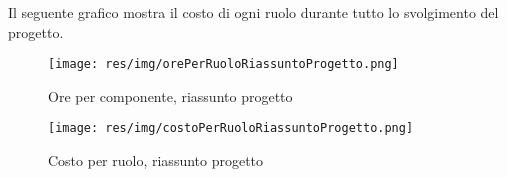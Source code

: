 Il seguente grafico mostra il costo di ogni ruolo durante tutto lo svolgimento del progetto.

\begin{figure}[H]
  \begin{center}
    \texttt{[image: res/img/orePerRuoloRiassuntoProgetto.png]}
  \caption{Ore per componente, riassunto progetto}
  \end{center} 
\end{figure}  

\begin{figure}[H]
  \begin{center}
    \texttt{[image: res/img/costoPerRuoloRiassuntoProgetto.png]}
  \caption{Costo per ruolo, riassunto progetto}
  \end{center} 
\end{figure}  

